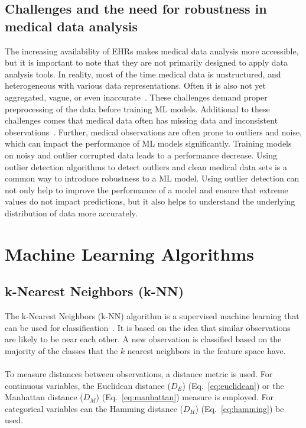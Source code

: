 \subsection{Challenges and the need for robustness in medical data analysis}    
The increasing availability of EHRs makes medical data analysis more accessible, but it is important to note that they are not primarily designed to apply data analysis tools. In reality, most of the time medical data is unstructured, and heterogeneous with various data representations. Often it is also not yet aggregated, vague, or even inaccurate~\cite{hariri_uncertainty_2019}. These challenges demand proper preprocessing of the data before training ML models. \newline\newline
Additional to these challenges comes that medical data often has missing data and inconsistent observations~\cite{qayyum_secure_2021}. Further, medical observations are often prone to outliers and noise, which can impact the performance of ML models significantly. Training models on noisy and outlier corrupted data leads to a performance decrease. Using outlier detection algorithms to detect outliers and clean medical data sets is a common way to introduce robustness to a ML model. Using outlier detection can not only help to improve the performance of a model and ensure that extreme values do not impact predictions, but it also helps to understand the underlying distribution of data more accurately.


\section{Machine Learning Algorithms}

\subsection{k-Nearest Neighbors (k-NN)}

The k-Nearest Neighbors (k-NN) algorithm is a supervised machine learning that can be used for classification~\cite{cover_nearest_1967}. It is based on the idea that similar observations are likely to be near each other. A new observation is classified based on the majority of the classes that the $k$ nearest neighbors in the feature space have. \\\\
To measure distances between observations, a distance metric is used. For continuous variables, the Euclidean distance ($D_E$) (Eq.~\ref{eq:euclidean}) or the Manhattan distance ($D_M$) (Eq.~\ref{eq:manhattan}) measure is employed. For categorical variables can the Hamming distance ($D_H$) (Eq.~\ref{eq:hamming}) be used.

